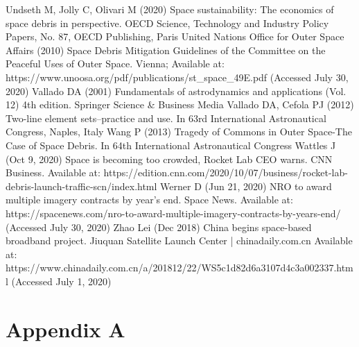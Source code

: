 \documentclass[12pt,a4paper,notitlepage,oneside,openright]{report}
\begin{document}
\begin{thebibliography}{100}
 Undseth M, Jolly C, Olivari M (2020) Space sustainability: The economics of space debris in perspective. OECD Science, Technology and Industry Policy Papers, No. 87, OECD Publishing, Paris
 United Nations Office for Outer Space Affairs (2010) Space Debris Mitigation Guidelines of the Committee on the Peaceful Uses of Outer Space. Vienna; Available at: https://www.unoosa.org/pdf/publications/st_space_49E.pdf (Accessed July 30, 2020)
 Vallado DA (2001) Fundamentals of astrodynamics and applications (Vol. 12) 4th edition. Springer Science \& Business Media
 Vallado DA, Cefola PJ (2012) Two-line element sets–practice and use. In 63rd International Astronautical Congress, Naples, Italy
 Wang P (2013) Tragedy of Commons in Outer Space-The Case of Space Debris. In 64th International Astronautical Congress
 Wattles J (Oct 9, 2020) Space is becoming too crowded, Rocket Lab CEO warns. CNN Business. Available at: https://edition.cnn.com/2020/10/07/business/rocket-lab-debris-launch-traffic-scn/index.html
 Werner D (Jun 21, 2020) NRO to award multiple imagery contracts by year’s end. Space News. Available at: https://spacenews.com/nro-to-award-multiple-imagery-contracts-by-years-end/ (Accessed July 30, 2020)
 Zhao Lei (Dec 2018) China begins space-based broadband project. Jiuquan Satellite Launch Center | chinadaily.com.cn Available at: https://www.chinadaily.com.cn/a/201812/22/WS5c1d82d6a3107d4c3a002337.html (Accessed July 1, 2020)




\end{thebibliography}


\newpage
\chapter*{Appendix A}
\label{app}
\end{document}
